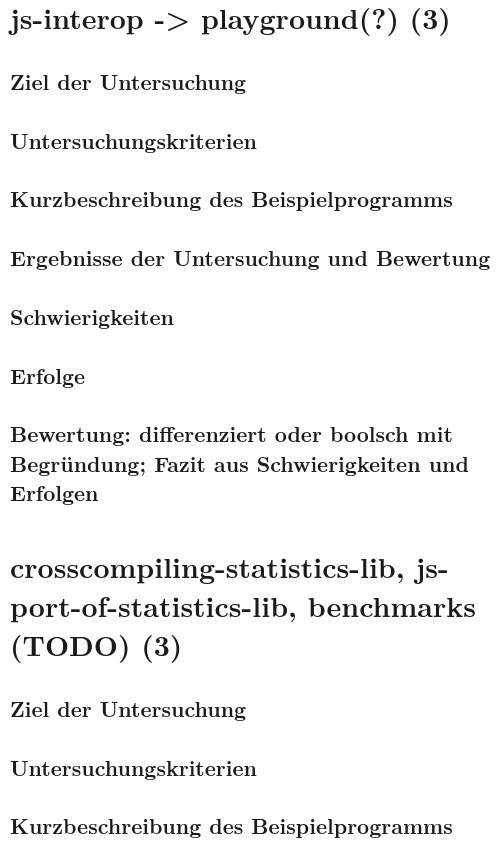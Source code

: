 \documentclass[a4paper, 12pt, hidelinks, listof=totoc, listoftables=totoc, bibliography=totoc]{scrreprt}
\begin{document}
\section{js-interop -> playground(?) (3)}

\subsection{Ziel der Untersuchung}
\subsection{Untersuchungskriterien}
\subsection{Kurzbeschreibung des Beispielprogramms}
\subsection{Ergebnisse der Untersuchung und Bewertung}
\subsection{Schwierigkeiten}
\subsection{Erfolge}
\subsection{Bewertung: differenziert oder boolsch mit Begründung; Fazit aus Schwierigkeiten und Erfolgen}

\section{crosscompiling-statistics-lib, js-port-of-statistics-lib, benchmarks (TODO) (3)}


\subsection{Ziel der Untersuchung}
\subsection{Untersuchungskriterien}
\subsection{Kurzbeschreibung des Beispielprogramms}
\end{document}
